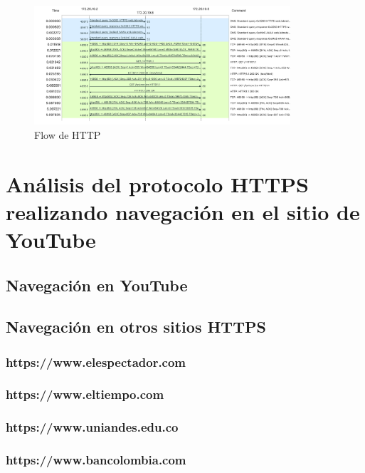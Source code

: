 \documentclass[10pt]{article}
\begin{document}
\begin{figure}[H]
    \centering
    \includegraphics[width=0.85\textwidth]{lab-02-screenshots/8.4-HTTP-flow}
    \caption{Flow de HTTP}
\end{figure}

\renewcommand{\thesection}{8.\arabic{section}}
\section{Análisis del protocolo HTTPS realizando navegación en el sitio de YouTube}
\subsection{Navegación en YouTube}
\subsection{Navegación en otros sitios HTTPS}
\subsubsection{https://www.elespectador.com}
\subsubsection{https://www.eltiempo.com}
\subsubsection{https://www.uniandes.edu.co}
\subsubsection{https://www.bancolombia.com}


\renewcommand{\thesection}{8.\arabic{section}}
\end{document}
